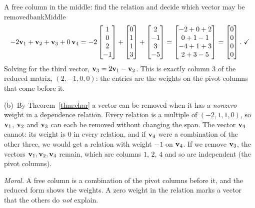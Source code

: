 \documentclass[11pt]{article}
\begin{document}
\begin{exmp}{A free column in the middle: find the relation and decide which vector may be removed}{bankMiddle}
\[
-2\bv{v}_1+\bv{v}_2+\bv{v}_3+0\,\bv{v}_4=-2\begin{bmatrix}1\\0\\2\\-1\end{bmatrix}+\begin{bmatrix}0\\1\\1\\3\end{bmatrix}+\begin{bmatrix}2\\-1\\3\\-5\end{bmatrix}=\begin{bmatrix}-2+0+2\\0+1-1\\-4+1+3\\2+3-5\end{bmatrix}=\begin{bmatrix}0\\0\\0\\0\end{bmatrix}.\ \checkmark
\]
Solving for the third vector, $\mathbf{v}_3=2\mathbf{v}_1-\mathbf{v}_2$. This is exactly column $3$ of the reduced matrix, $(2,-1,0,0)$: the entries are the weights on the pivot columns that come before it.

(b)~By Theorem~\ref{thm:char} a vector can be removed when it has a \emph{nonzero} weight in a dependence relation. Every relation is a multiple of $(-2,1,1,0)$, so $\mathbf{v}_1$, $\mathbf{v}_2$ and $\mathbf{v}_3$ can each be removed without changing the span. The vector $\mathbf{v}_4$ cannot: its weight is $0$ in every relation, and if $\mathbf{v}_4$ were a combination of the other three, we would get a relation with weight $-1$ on $\mathbf{v}_4$. If we remove $\mathbf{v}_3$, the vectors $\mathbf{v}_1,\mathbf{v}_2,\mathbf{v}_4$ remain, which are columns $1$, $2$, $4$ and so are independent (the pivot columns).

\emph{Moral.} A free column is a combination of the pivot columns before it, and the reduced form shows the weights. A zero weight in the relation marks a vector that the others do \emph{not} explain.
\end{exmp}
\end{document}
